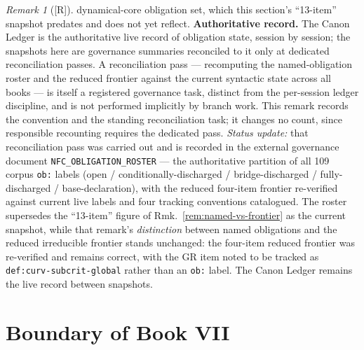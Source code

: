 \documentclass[12pt,oneside]{amsbook}
\theoremstyle{plain}
\theoremstyle{definition}
\theoremstyle{remark}
\newtheorem{remark}[theorem]{Remark}
\newcommand{\status}[1]{\textup{[#1]}}
\begin{document}
\begin{remark}[\status{R}]
dynamical-core obligation set, which this section's ``13-item''
snapshot predates and does not yet reflect.  \textbf{Authoritative
record.}  The Canon Ledger is the authoritative live record of
obligation state, session by session; the snapshots here are
governance summaries reconciled to it only at dedicated
reconciliation passes.  A reconciliation pass --- recomputing the
named-obligation roster and the reduced frontier against the current
syntactic state across all books --- is itself a registered
governance task, distinct from the per-session ledger discipline,
and is not performed implicitly by branch work.  This remark records
the convention and the standing reconciliation task; it changes no
count, since responsible recounting requires the dedicated pass.
\emph{Status update:} that reconciliation pass was carried out and is
recorded in the external governance document
\texttt{NFC\_OBLIGATION\_ROSTER} --- the authoritative partition of all
109 corpus \texttt{ob:} labels (open / conditionally-discharged /
bridge-discharged / fully-discharged / base-declaration), with the
reduced four-item frontier re-verified against current live labels and
four tracking conventions catalogued.  The roster supersedes the
``13-item'' figure of Rmk.~\ref{rem:named-vs-frontier} as the current
snapshot, while that remark's \emph{distinction} between named
obligations and the reduced irreducible frontier stands unchanged: the
four-item reduced frontier was re-verified and remains correct, with
the GR item noted to be tracked as \texttt{def:curv-subcrit-global}
rather than an \texttt{ob:} label.  The Canon Ledger remains the live
record between snapshots.
\end{remark}

\section{Boundary of Book VII}
\end{document}
